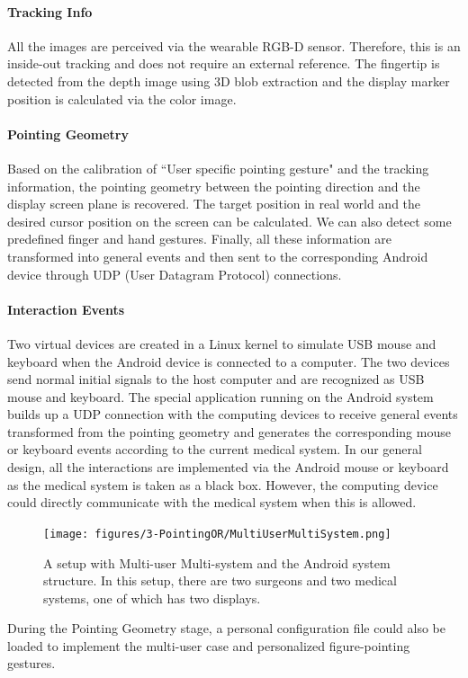 {\paragraph{Tracking Info} 
All the images are perceived via the wearable RGB-D sensor. Therefore, this is an inside-out tracking and does not require an external reference. The fingertip is detected from the depth image using 3D blob extraction and the display marker position is calculated via the color image.
\paragraph{Pointing Geometry}
Based on the calibration of ``User specific pointing gesture" and the tracking information,
the pointing geometry between the pointing direction and the display screen plane is recovered. The target position in real world and the desired cursor position on the screen can be calculated. We can also detect some predefined finger and hand gestures. Finally, all these information are transformed into general events and then sent to the corresponding Android device through UDP (User Datagram Protocol) connections. 
\paragraph{Interaction Events}
Two virtual devices are created in a Linux kernel to simulate USB mouse and keyboard when the Android device is connected to a computer. The two devices send normal initial signals to the host computer and are recognized as USB mouse and keyboard. The special application running on the Android system builds up a UDP connection with the computing devices to receive general events transformed from the pointing geometry and generates the corresponding mouse or keyboard events according to the current medical system. In our general design, all the interactions are implemented via the Android mouse or keyboard as the medical system is taken as a black box. However, the computing device could directly communicate with the medical system when this is allowed. 
\begin{figure} [htb]
	\texttt{[image: figures/3-PointingOR/MultiUserMultiSystem.png]}
	\caption{A setup with Multi-user Multi-system and the Android system structure. In this setup, there are two surgeons and two medical systems, one of which has two displays. }
	\label{fig:3-PointingOR:multiUserMultiSystem}       %
\end{figure}
During the Pointing Geometry stage, a personal configuration file could also be loaded to implement the multi-user case and personalized figure-pointing gestures. 
}
